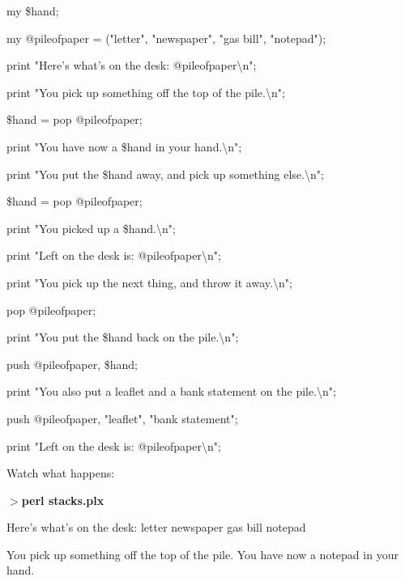 \documentclass[a4paper,11pt]{book}
\begin{document}
\noindent my \$hand;

\noindent my @pileofpaper = ("letter", "newspaper", "gas bill", "notepad");

\noindent 

\noindent 

\noindent print "Here's what's on the desk: @pileofpaper\textbackslash n";

\noindent 

\noindent print "You pick up something off the top of the pile.\textbackslash n";

\noindent \$hand = pop @pileofpaper;

\noindent print "You have now a \$hand in your hand.\textbackslash n";

\noindent 

\noindent print "You put the \$hand away, and pick up something else.\textbackslash n";

\noindent \$hand = pop @pileofpaper;

\noindent print "You picked up a \$hand.\textbackslash n";

\noindent 

\noindent print "Left on the desk is: @pileofpaper\textbackslash n";

\noindent 

\noindent print "You pick up the next thing, and throw it away.\textbackslash n";

\noindent pop @pileofpaper;

\noindent 

\noindent print "You put the \$hand back on the pile.\textbackslash n";

\noindent push @pileofpaper, \$hand;

\noindent 

\noindent print "You also put a leaflet and a bank statement on the pile.\textbackslash n";

\noindent push @pileofpaper, "leaflet", "bank statement";

\noindent 

\noindent print "Left on the desk is: @pileofpaper\textbackslash n";

\noindent 

\noindent Watch what happens:

\noindent 

\noindent $>$\textbf{perl stacks.plx}

\noindent Here's what's on the desk: letter newspaper gas bill notepad

\noindent You pick up something off the top of the pile. You have now a notepad in your hand.
\end{document}
